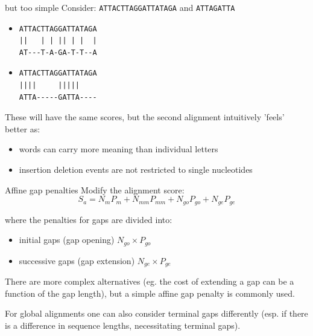 \documentclass[pdf]{beamer}
\begin{document}
\begin{frame}[fragile]{but too simple}
  Consider: \verb|ATTACTTAGGATTATAGA| and \verb|ATTAGATTA|
  \pause
  \begin{itemize}
  \item 
\begin{verbatim}
ATTACTTAGGATTATAGA
||   | | || | |  |
AT---T-A-GA-T-T--A
\end{verbatim} \pause
  \item
\begin{verbatim}
ATTACTTAGGATTATAGA
||||     |||||
ATTA-----GATTA----
\end{verbatim}
\end{itemize}
These will have the same scores, but the second alignment intuitively 'feels' better as:
\begin{itemize}
\item words can carry more meaning than individual letters
\item insertion deletion events are not restricted to single nucleotides
\end{itemize}
\end{frame}

\begin{frame}{Affine gap penalties}
Modify the alignment score:
  $$
  S_a =  N_{m}P_m + N_{mm}P_{mm}  + N_{go}P_{go} + N_{ge}P_{ge}
  $$

  where the penalties for gaps are divided into:
  \begin{itemize}
    \item initial gaps (gap opening) \hspace{4.75ex} $N_{go} \times P_{go}$
    \item successive gaps (gap extension) $N_{ge}\times P_{ge}$
  \end{itemize}
  \pause
  There are more complex alternatives (eg. the cost of extending a gap can
  be a function of the gap length), but a simple affine gap penalty is
  commonly used.

  For global alignments one can also consider terminal gaps differently
  (esp. if there is a difference in sequence lengths, necessitating terminal gaps).
\end{frame}
\end{document}
